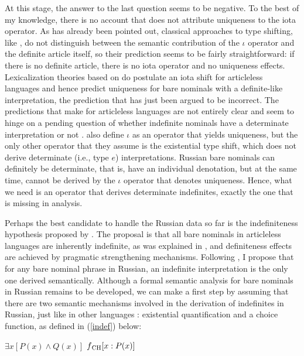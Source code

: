 \documentclass[output=paper,colorlinks,citecolor=brown]{langscibook}
\begin{document}
At this stage, the answer to the last question seems to be negative. To the best of my knowledge, there is no account that does not attribute uniqueness to the iota operator. As has already been pointed out, classical approaches to type shifting, like \citet{partee87}, do not distinguish between the semantic contribution of the $\iota$ operator and the definite article itself, so their prediction seems to be fairly straightforward: if there is no definite article, there is no iota operator and no uniqueness effects. Lexicalization theories based on \citet{chierchia98, dayal04} do postulate an iota shift for articleless languages and hence predict uniqueness for bare nominals with a definite-like interpretation, the prediction that has just been argued to be incorrect. The predictions that \citet{coppockbeaver15} make for articleless languages are not entirely clear and seem to hinge on a pending question of whether indefinite nominals have a determinate interpretation or not \citep[cf.][424]{coppockbeaver15}. \citet{coppockbeaver15} also define $\iota$ as an operator that yields uniqueness, but the only other operator that they assume is the existential type shift, which does not derive determinate (i.e., type $e$) interpretations. Russian bare nominals can definitely be determinate, that is, have an individual denotation, but at the same time, cannot be derived by the $\iota$ operator that denotes uniqueness. Hence, what we need is an operator that derives determinate indefinites, exactly the one that is missing in  analysis. 

Perhaps the best candidate to handle the Russian data so far is the indefiniteness hypothesis proposed by \citet{Heim2011}. The proposal is that all bare nominals in articleless languages are inherently indefinite, as was explained in , and definiteness effects are achieved by pragmatic strengthening mechanisms. Following \citet{Heim2011}, I propose that for any bare nominal phrase in Russian, an indefinite interpretation is the only one derived semantically. Although a formal semantic analysis for bare nominals in Russian remains to be developed, we can make a first step by assuming that there are two semantic mechanisms involved in the derivation of indefinites in Russian, just like in other languages \citep[cf.][]{Reinhart1997}: existential quantification and a choice function, as defined in (\ref{indef}) below:

\ea \label{indef}
\ea $\exists x [P(x) \wedge Q(x)]$
\ex $ f\textsubscript{CH}[{x: P(x)}] $ \label{choice}
\z
\z
\end{document}
